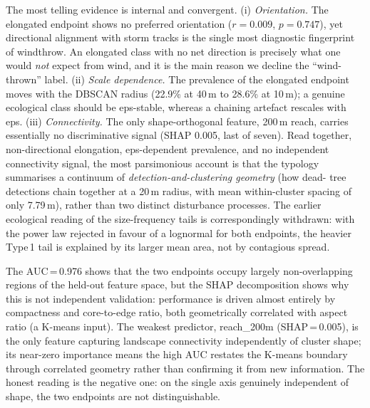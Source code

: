 \documentclass[twocolumn]{article}
\begin{document}
\label{sec:disc-orientation}
The most telling evidence is internal and convergent. (i) \emph{Orientation.} The elongated
endpoint shows no preferred orientation ($r = 0.009$, $p = 0.747$), yet directional alignment
with storm tracks is the single most diagnostic fingerprint of windthrow. An elongated class with
no net direction is precisely what one would \emph{not} expect from wind, and it is the main
reason we decline the ``wind-thrown'' label. (ii) \emph{Scale dependence.} The prevalence of the
elongated endpoint moves with the DBSCAN radius (22.9\% at 40\,m to 28.6\% at 10\,m); a genuine
ecological class should be eps-stable, whereas a chaining artefact rescales with eps. (iii)
\emph{Connectivity.} The only shape-orthogonal feature, 200\,m reach, carries essentially no
discriminative signal (SHAP 0.005, last of seven). Read together, non-directional elongation,
eps-dependent prevalence, and no independent connectivity signal, the most parsimonious account
is that the typology summarises a continuum of \emph{detection-and-clustering geometry} (how dead-
tree detections chain together at a 20\,m radius, with mean within-cluster spacing of only
7.79\,m), rather than two distinct disturbance processes. The earlier ecological reading of the
size-frequency tails is correspondingly withdrawn: with the power law rejected in favour of a
lognormal for both endpoints, the heavier Type\,1 tail is explained by its larger mean area, not
by contagious spread.

The AUC\,=\,0.976 shows that the two endpoints occupy largely non-overlapping regions of the
held-out feature space, but the SHAP decomposition shows why this is not independent validation:
performance is driven almost entirely by compactness and core-to-edge ratio, both geometrically
correlated with aspect ratio (a K-means input). The weakest predictor, reach\_200m
(SHAP\,=\,0.005), is the only feature capturing landscape connectivity independently of cluster
shape; its near-zero importance means the high AUC restates the K-means boundary through
correlated geometry rather than confirming it from new information. The honest reading is the
negative one: on the single axis genuinely independent of shape, the two endpoints are not
distinguishable.
\end{document}
